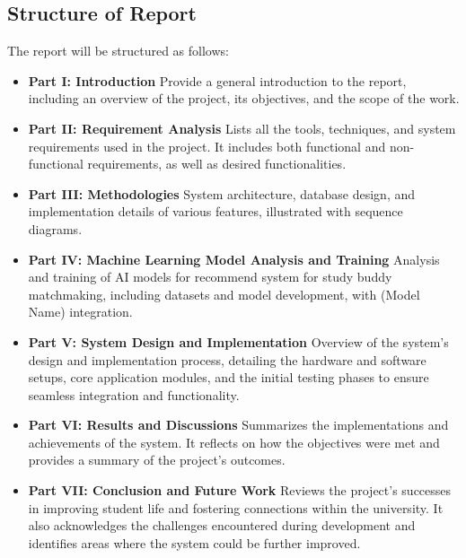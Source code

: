 \documentclass[12pt]{article}
\begin{document}
\subsection{Structure of Report}
The report will be structured as follows:
\begin{itemize}
    \item \textbf{Part I: Introduction }
    \newline
    Provide a general introduction to the report, including an overview of the project, its objectives, and the scope of the work.
    \item \textbf{Part II: Requirement Analysis }
    \newline
    Lists all the tools, techniques, and system requirements used in the project. It includes
    both functional and non-functional requirements, as well as desired functionalities.
    \item \textbf{Part III: Methodologies }
    \newline
    System architecture, database design, and implementation details of various features, illustrated with sequence diagrams.
    \item \textbf{Part IV: Machine Learning Model Analysis and Training }
    \newline
    Analysis and training of AI models for recommend system for study buddy matchmaking, including datasets and model development, with (Model Name) integration.
    \item \textbf{Part V: System Design and Implementation }
    \newline
    Overview of the system's design and implementation process, detailing the hardware and software setups, core application modules, and the initial testing phases to ensure seamless integration and functionality.
    \item \textbf{Part VI: Results and Discussions }
    \newline 
    Summarizes the implementations and achievements of the system. It reflects on how the
    objectives were met and provides a summary of the project's outcomes.
    \item \textbf{Part VII: Conclusion and Future Work }
    \newline
    Reviews the project's successes in improving student life and fostering connections within the university.
    It also acknowledges the challenges encountered during development and identifies areas where the system could be further improved.
\end{itemize}
\end{document}
